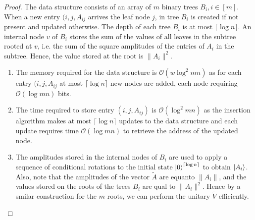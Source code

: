 \documentclass[10pt,twoside,reqno]{amsart} %
\theoremstyle{plain}
\theoremstyle{definition}
\begin{document}
\begin{proof}
  The data structure consists of an array of $m$ binary trees $B_i,i\in[m]$.
  When a new entry $(i,j,A_{ij}$ arrives the leaf node $j$, in tree $B_i$ is
  created if not present and updated otherwise. The depth of each tree $B_i$
  is at most $\lceil\log n\rceil$. An internal node $v$ of $B_i$ stores the sum
  of the values of all leaves in the subtree rooted at $v$, i.e. the sum of
  the square amplitudes of the entries of $A_i$ in the subtree. Hence, the value
  stored at the root is $\|A_i\|^2$. 
  \begin{enumerate}
    \item The memory required for the data structure is $\mathcal{O}(w\log^2 mn)$
      as for each entry $(i,j,A_{ij}$ at most $\lceil\log n\rceil$ new nodes are
      added, each node requiring $\mathcal{O}(\log mn)$ bits.
    \item The time required to store entry $(i,j,A_{ij})$ is $\mathcal{O}(\log^2
      mn)$ as the insertion algorithm makes at most $\lceil \log n\rceil$ updates
      to the data structure and each update requires time $\mathcal{O}(\log mn)$
      to retrieve the address of the updated node.
    \item The amplitudes stored in the internal nodes of $B_i$ are used to
      apply a sequence of conditional rotations to the initial state
      $\ket0^{\lceil\log n\rceil}$ to obtain $\ket{A_i}$. Also, note that the
      amplitudes of the vector $\widetilde{A}$ are equanto $\|A_i\|$,
      and the values stored on the roots of the trees $B_i$ are qual to 
      $\|A_i\|^2$. Hence by a smilar construction for the $m$ roots, we can
      perform the unitary $\widetilde{V}$ efficiently.
  \end{enumerate}
  
\end{proof}
\end{document}
